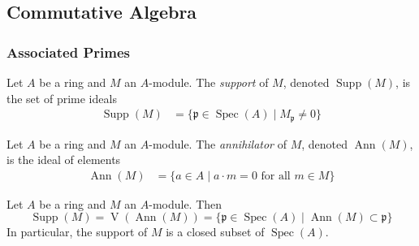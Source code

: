 \documentclass[12pt]{article}
\begin{document}
\subsection{Commutative Algebra}
\subsubsection{Associated Primes}
\begin{definition}
    Let $A$ be a ring and $M$ an $A$-module. The \textit{support} of $M$, denoted $\operatorname{Supp}(M)$, is the set of prime ideals
    \begin{align*}
        \operatorname{Supp}(M) & = \{\mathfrak{p} \in \operatorname{Spec}(A) \mid M_{\mathfrak{p}} \neq 0\}
    \end{align*}
\end{definition}

\begin{definition}
    Let $A$ be a ring and $M$ an $A$-module. The \textit{annihilator} of $M$, denoted $\operatorname{Ann}(M)$, is the ideal of elements
    \begin{align*}
        \operatorname{Ann}(M) & = \{a \in A \mid a \cdot m = 0 \text{ for all } m \in M\}
    \end{align*}
\end{definition}

\begin{proposition}
    Let $A$ be a ring and $M$ an $A$-module. Then \[\operatorname{Supp}(M) = \operatorname{V}(\operatorname{Ann}(M)) = \{\mathfrak{p} \in \operatorname{Spec}(A) \mid \operatorname{Ann}(M) \subset \mathfrak{p}\}\] In particular, the support of $M$ is a closed subset of $\operatorname{Spec}(A)$.
\end{proposition}
\end{document}
